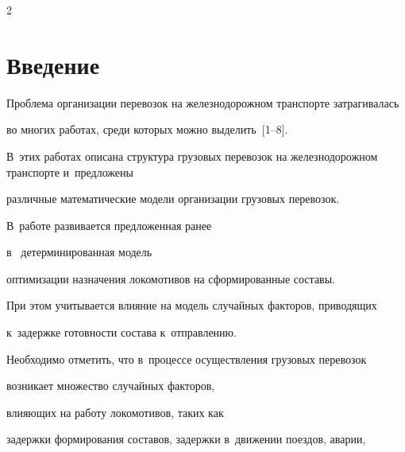 \begin{multicols}{2}





\label{st\stat}





\section{Введение}





\vspace*{-4pt}


    


Проблема организации перевозок на железнодорожном транспорте затрагивалась 


во многих работах, среди которых можно выделить~[1--8].




В~этих работах описана структура грузовых перевозок на железнодорожном транспорте и~предложены


различные математические модели организации грузовых перевозок.








В~работе развивается предложенная ранее 


в~\cite{AzanovBuyanov} детерминированная модель


оптимизации назначения локомотивов на сформированные составы.


При этом учитывается влияние на модель случайных факторов, приводящих 


к~задержке готовности состава к~отправлению.


    


Необходимо отметить, что в~процессе осуществления грузовых перевозок 


возникает множество случайных факторов,


влияющих на работу локомотивов, таких как


задержки формирования составов, задержки в~движении поездов, аварии, 



\end{multicols}
